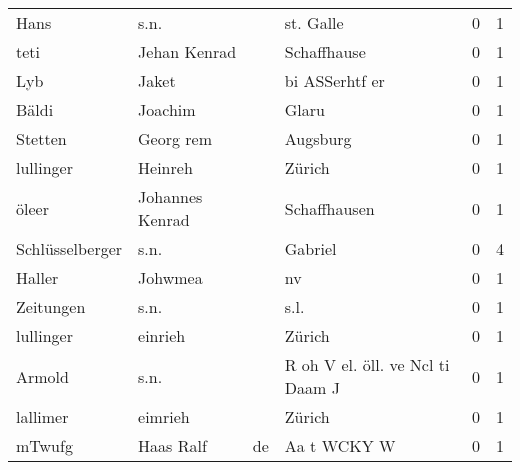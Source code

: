 \begin{center}
\begin{tiny}
\begin{longtabu}{llllrr}
                     Hans &                               s.n. &             &                                   st. Galle &          0 &         1 \\
                     teti &                       Jehan Kenrad &             &                                 Schaffhause &          0 &         1 \\
                      Lyb &                              Jaket &             &                              bi ASSerhtf er &          0 &         1 \\
                    Bäldi &                            Joachim &             &                                       Glaru &          0 &         1 \\
                  Stetten &                          Georg rem &             &                                    Augsburg &          0 &         1 \\
                lullinger &                            Heinreh &             &                                      Zürich &          0 &         1 \\
                    öleer &                    Johannes Kenrad &             &                                Schaffhausen &          0 &         1 \\
          Schlüsselberger &                               s.n. &             &                                     Gabriel &          0 &         4 \\
                   Haller &                            Johwmea &             &                                          nv &          0 &         1 \\
                Zeitungen &                               s.n. &             &                                        s.l. &          0 &         1 \\
                lullinger &                            einrieh &             &                                      Zürich &          0 &         1 \\
                   Armold &                               s.n. &             &            R oh V el. öll. ve Ncl ti Daam J &          0 &         1 \\
                 lallimer &                            eimrieh &             &                                      Zürich &          0 &         1 \\
                   mTwufg &                          Haas Ralf &          de &                                 Aa t WCKY W &          0 &         1 \\

\end{longtabu}
\end{tiny}
\end{center}

